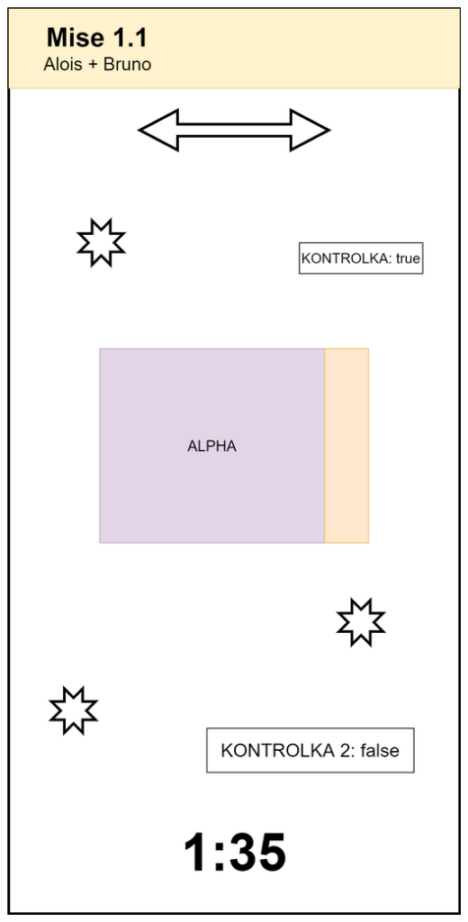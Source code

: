 \documentclass[czech,aspectratio=169]{beamer}
\begin{document}
\begin{frame}
\begin{columns}
\begin{column}{.25\textwidth}
\begin{center}
          \includegraphics[width=.9\textwidth]{slides/screen-3}
        \end{center}
      \end{column}
    \end{columns}
  \end{frame}
\end{document}

